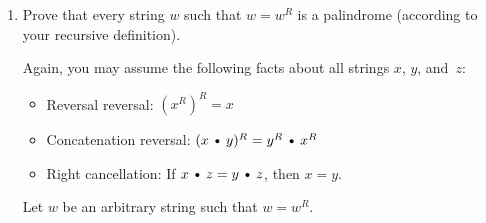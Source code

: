 \documentclass[11pt]{article}
\def\Cdot{\mathbin{\text{\normalfont \textbullet}}}
\begin{document}
\begin{enumerate}
\begin{enumerate}
\begin{Solution}
Let $w$ be an arbitrary palindrome.

Assume that $x = x^R$ for every palindrome $x$ such that $\abs{x}<\abs{w}$.

There are three cases to consider (mirroring the definition of “palindrome”):
\begin{itemize}
\item
If $w = \e$, then $w^R = \e$ by definition, so $w = w^R$.

\item
If $w = a$ for some symbol $a\in\Sigma$, then $w^R = a$ by definition, so $w = w^R$.

\item
Finally, if $w = axa$ for some symbol $a\in\Sigma$ and some palindrome $x\in P$, then 
\begin{align*}
	w^R
	&=	(a \cdot x \Cdot a)^R		& \text{because w = axa}\\
	&=	(x\Cdot a)^R \Cdot a			& \text{by definition of reversal} \\
	&=	a^R \Cdot x^R \Cdot a		& \text{by concatenation reversal}\\
	&=	a \Cdot x^R \Cdot a			& \text{by definition of reversal} \\
	&=	a \Cdot x \Cdot a			& \text{by the inductive hypothesis} \\
	&=	w							& \text{because w = axa}
\end{align*}
\end{itemize}
In all three cases, we conclude that $w = w^R$. \EOS
\end{Solution}
\unskip
\begin{rubric}
4 points: standard induction rubric (scaled)
\end{rubric}


\item
Prove that every string $w$ such that $w = w^R$ is a palindrome (according to your recursive definition).

Again, you may assume the following facts about all strings $x$, $y$, and~$z$:
\begin{itemize}
\item Reversal reversal: $(x^R)^R = x$
\item Concatenation reversal: $(x\Cdot y)^R = y^R\Cdot x^R$
\item Right cancellation:  If $x\Cdot z = y\Cdot z$, then $x = y$.
\end{itemize}


\begin{Solution}\parindent0pt
Let $w$ be an arbitrary string such that $w = w^R$.


\end{Solution}
\end{enumerate}
\end{enumerate}
\end{document}
